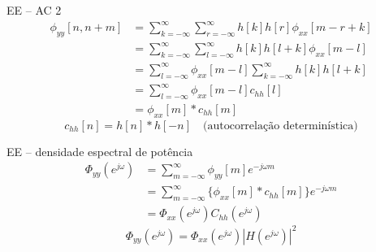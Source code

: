 \documentclass[
size=17pt,
paper=smartboard,
mode=present,
display=slidesnotes,
style=sailor,
nopagebreaks,
blackslide,
fleqn]{powerdot}
\begin{document}
\begin{slide}[toc=]{EE -- AC 2}
   \scriptsize{
   \begin{align*}
      \phi_{yy}[n,n+m] &= %
             \sum_{k=-\infty}^{\infty} \sum_{r=-\infty}^{\infty} h[k]h[r] \phi_{xx}[m-r+k]\\
             &= \sum_{k=-\infty}^{\infty} \sum_{l=-\infty}^{\infty} h[k]h[l+k] \phi_{xx}[m-l]\\
             &= \sum_{l=-\infty}^{\infty} \phi_{xx}[m-l]\sum_{k=-\infty}^{\infty} h[k]h[l+k] \\
             &= \sum_{l=-\infty}^{\infty} \phi_{xx}[m-l] c_{hh}[l] \\
             &= \phi_{xx}[m]*c_{hh}[m]    
   \end{align*}}
   \begin{equation*}
      c_{hh}[n]= h[n]*h[-n]  \quad\text{(autocorrelação determin\'istica)} 
   \end{equation*}
\end{slide}



\begin{slide}[toc=]{EE -- densidade espectral de potência}
\begin{align*}
   \Phi_{yy}(e^{j\omega}) &= \sum_{m=-\infty}^{\infty}  \phi_{yy}[m]e^{-j\omega m}\\
                          &= \sum_{m=-\infty}^{\infty}  \{\phi_{xx}[m]*c_{hh}[m]\} e^{-j\omega m}\\
                          &= \Phi_{xx}(e^{j\omega}) C_{hh}(e^{j\omega})
\end{align*}
\begin{equation*}
     \boxed{\Phi_{yy}(e^{j\omega}) = \Phi_{xx}(e^{j\omega}) |H(e^{j\omega})|^2} 
  \end{equation*}
\end{slide}
\end{document}
